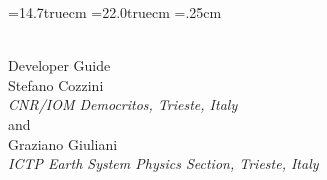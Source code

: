 \hsize=14.7truecm
\vsize=22.0truecm
\hoffset=.25cm
\voffset=7cm

\begin{center}
{\Huge \PR } \\
{\Large Developer Guide } \\
\vspace{2cm}
{\large Stefano Cozzini } \\
{\em CNR/IOM  Democritos, Trieste, Italy} \\
{ and } \\
{\large Graziano Giuliani  } \\
{\em  ICTP Earth System Physics Section, Trieste, Italy} \\
\end{center}

\date{}
